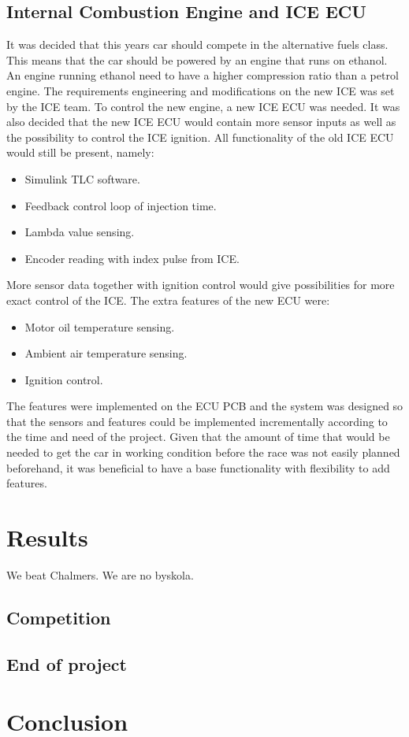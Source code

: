 \subsection{Internal Combustion Engine and ICE ECU}
It was decided that this years car should compete in the alternative fuels
class. This means that the car should be powered by an engine that runs on
ethanol. An engine running ethanol need to have a higher compression ratio than
a petrol engine.
The requirements engineering and modifications on the new ICE was set by the ICE
team. To control the new engine, a new ICE ECU was needed. It was also decided
that the new ICE ECU would contain more sensor inputs as well as the possibility
to control the ICE ignition. All functionality of the old ICE ECU would still be
present, namely:
\begin{itemize}
    \item Simulink TLC software.
    \item Feedback control loop of injection time.
    \item Lambda value sensing.
    \item Encoder reading with index pulse from ICE.
\end{itemize}
More sensor data together with ignition control would give possibilities
for more exact control of the ICE. The extra features of the new ECU were:
\begin{itemize}
    \item Motor oil temperature sensing.
    \item Ambient air temperature sensing.
    \item Ignition control.
\end{itemize}
The features were implemented on the ECU PCB and the system was designed so that
the sensors and features could be implemented incrementally according to the
time and need of the project. Given that the amount of time that would be needed
to get the car in working condition before the race was not easily planned
beforehand, it was beneficial to have a base functionality with flexibility to
add features.

\section{Results}
We beat Chalmers. We are no byskola.
\subsection{Competition}

\subsection{End of project}

\section{Conclusion}

